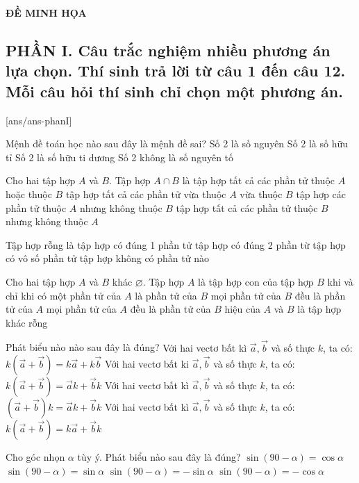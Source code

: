 \documentclass[12pt,a4paper]{article}
\begin{document}
\begin{center}
\textbf{\LARGE ĐỀ MINH HỌA}
\end{center}
\subsection*{PHẦN I. Câu trắc nghiệm nhiều phương án lựa chọn. Thí sinh trả lời từ câu 1 đến câu 12. Mỗi câu hỏi thí sinh chỉ chọn một phương án.}
	\setcounter{ex}{0}
	[ans/ans-phanI]
\begin{ex}
Mệnh đề toán học nào sau đây là mệnh đề sai?
\choice
{Số 2 là số nguyên}
{Số 2 là số hữu tỉ}
{Số 2 là số hữu ti dương}
{\True Số 2 không là số nguyên tố}
\loigiai
{

}
\end{ex}
\begin{ex}
Cho hai tập hợp $A$ và $B$. Tập hợp $A \cap B$ là
\choice
{tập hợp tất cả các phần tử thuộc $A$ hoặc thuộc $B$}
{\True tập hợp tất cả các phần tử vừa thuộc $A$ vừa thuộc $B$}
{tập hợp các phần tử thuộc $A$ nhưng không thuộc $B$}
{tập hợp tất cả các phần tử thuộc $B$ nhưng không thuộc $A$}
\loigiai
{

}
\end{ex}
\begin{ex}
Tập hợp rỗng là
\choice
{tập hợp có đúng 1 phần tử}
{tập hợp có đúng 2 phần từ}
{tập hợp có vô số phần tử}
{\True tập hợp không có phần tử nào}
\loigiai
{

}
\end{ex}
\begin{ex}
Cho hai tập hợp $A$ và $B$ khác $\varnothing$. Tập hợp $A$ là tập hợp con của tập hợp $B$ khi và chỉ khi
\choice
{có một phần tử của $A$ là phần tử của $B$}
{mọi phần tử của $B$ đều là phần tử của $A$}
{\True mọi phần tử của $A$ đều là phần tử của $B$}
{hiệu của $A$ và $B$ là tập hợp khác rỗng}
\loigiai
{

}
\end{ex}
\begin{ex}
Phát biểu nào nào sau đây là đúng?
\choice
{\True Với hai vectơ bất kì $\vec{a}, \vec{b}$ và số thực $k$, ta có: $k(\vec{a}+\vec{b})=k \vec{a}+k \vec{b}$}
{Với hai vectơ bất ki $\vec{a}, \vec{b}$ và số thực $k$, ta có: $k(\vec{a}+\vec{b})=\vec{a} k+\vec{b} k$}
{Với hai vectơ bất kì $\vec{a}, \vec{b}$ và số thực $k$, ta có: $(\vec{a}+\vec{b}) k=\vec{a} k+\vec{b} k$}
{Với hai vectơ bất kì $\vec{a}, \vec{b}$ và số thực $k$, ta có: $k(\vec{a}+\vec{b})=k \vec{a}+\vec{b} k$}
\loigiai
{

}
\end{ex}
\begin{ex}
Cho góc nhọn $\alpha$ tùy ý. Phát biểu nào sau đây là đúng?
\choice
{\True $\sin (90-\alpha)=\cos \alpha$}
{$\sin (90-\alpha)=\sin \alpha$}
{$\sin (90-\alpha)=-\sin \alpha$}
{$\sin (90-\alpha)=-\cos \alpha$}
\loigiai
{

}
\end{ex}
\end{document}
